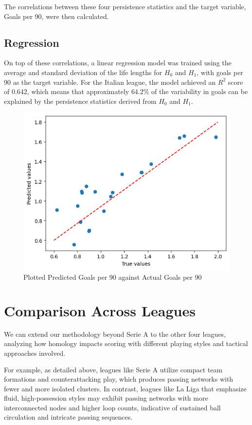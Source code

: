 \documentclass[10pt,twocolumn]{article}
\begin{document}
The correlations between these four persistence statistics and the target variable, Goals per 90, were then calculated.

\subsection*{Regression}
On top of these correlations, a linear regression model was trained using the average and standard deviation of the life lengths for $ H_0 $ and $ H_1 $, with goals per 90 as the target variable. For the Italian league, the model achieved an $R^2$ score of $0.642$, which means that approximately $64.2\%$ of the variability in goals can be explained by the persistence statistics derived from $ H_0 $ and $ H_1 $.

\begin{figure}[H]
    \centering
    \includegraphics[width=1\linewidth]{images/serie_A_linear_reg.png}
    \caption{Plotted Predicted Goals per 90 against Actual Goals per 90}
    \label{fig:serie_A_linear_reg}
\end{figure}

\section*{Comparison Across Leagues}
We can extend our methodology beyond Serie A to the other four leagues, analyzing how homology impacts scoring with different playing styles and tactical approaches involved. 

For example, as detailed above, leagues like Serie A utilize compact team formations and counterattacking play, which produces passing networks with fewer and more isolated clusters. In contrast, leagues like La Liga that emphasize fluid, high-possession styles may exhibit passing networks with more interconnected nodes and higher loop counts, indicative of sustained ball circulation and intricate passing sequences. 
\end{document}

